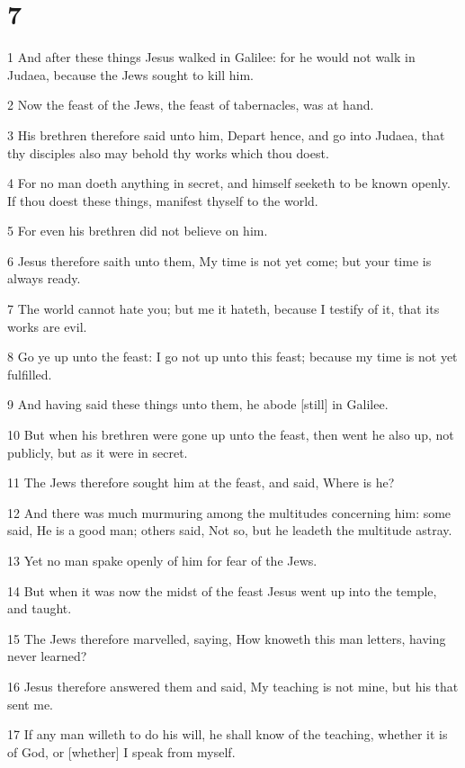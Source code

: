\chapter{7}

\par 1 And after these things Jesus walked in Galilee: for he would not walk in Judaea, because the Jews sought to kill him.
\par 2 Now the feast of the Jews, the feast of tabernacles, was at hand.
\par 3 His brethren therefore said unto him, Depart hence, and go into Judaea, that thy disciples also may behold thy works which thou doest.
\par 4 For no man doeth anything in secret, and himself seeketh to be known openly. If thou doest these things, manifest thyself to the world.
\par 5 For even his brethren did not believe on him.
\par 6 Jesus therefore saith unto them, My time is not yet come; but your time is always ready.
\par 7 The world cannot hate you; but me it hateth, because I testify of it, that its works are evil.
\par 8 Go ye up unto the feast: I go not up unto this feast; because my time is not yet fulfilled.
\par 9 And having said these things unto them, he abode [still] in Galilee.
\par 10 But when his brethren were gone up unto the feast, then went he also up, not publicly, but as it were in secret.
\par 11 The Jews therefore sought him at the feast, and said, Where is he?
\par 12 And there was much murmuring among the multitudes concerning him: some said, He is a good man; others said, Not so, but he leadeth the multitude astray.
\par 13 Yet no man spake openly of him for fear of the Jews.
\par 14 But when it was now the midst of the feast Jesus went up into the temple, and taught.
\par 15 The Jews therefore marvelled, saying, How knoweth this man letters, having never learned?
\par 16 Jesus therefore answered them and said, My teaching is not mine, but his that sent me.
\par 17 If any man willeth to do his will, he shall know of the teaching, whether it is of God, or [whether] I speak from myself.
